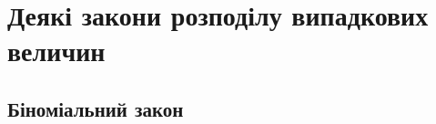 \section{Деякі закони розподілу випадкових величин}

\subsection{Біноміальний закон}
\begin{definition}
    
\end{definition}